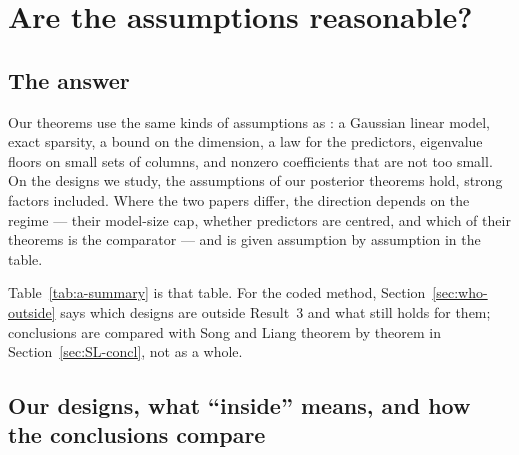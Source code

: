 \section{Are the assumptions reasonable?}\label{sec:assumptions}

\subsection{The answer}\label{sec:a-answer}

Our theorems use the same kinds of assumptions as \citet{SongLiang2015}: a Gaussian linear model, exact sparsity, a
bound on the dimension, a law for the predictors, eigenvalue floors on small sets of columns, and nonzero coefficients
that are not too small. On the designs we study, the assumptions of our posterior theorems hold, strong factors
included. Where the two papers differ, the direction depends on the regime --- their model-size cap, whether predictors
are centred, and which of their theorems is the comparator --- and is given assumption by assumption in the table.

Table~\ref{tab:a-summary} is that table. For the coded method, Section~\ref{sec:who-outside} says which designs are outside Result~3 and what still
holds for them; conclusions are compared with Song and Liang theorem by theorem in Section~\ref{sec:SL-concl}, not as a
whole.

\subsection{Our designs, what ``inside'' means, and how the conclusions compare}\label{sec:a-setting}

